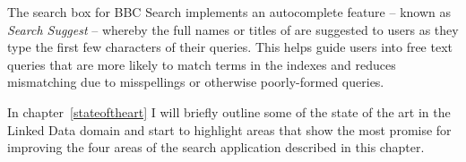 The search box for BBC Search implements an autocomplete
feature -- known
as \emph{Search Suggest} -- whereby
the full names or titles of are suggested to users as they type the first
few characters of their queries. This helps guide users into free text
queries that are more likely to match terms in the indexes and reduces
mismatching due to misspellings or otherwise poorly-formed queries.

In chapter~\ref{stateoftheart} I will briefly outline some of the state of the
art in the Linked Data domain and start to highlight areas that show
the most promise for improving the four areas of the search application
described in this chapter.
